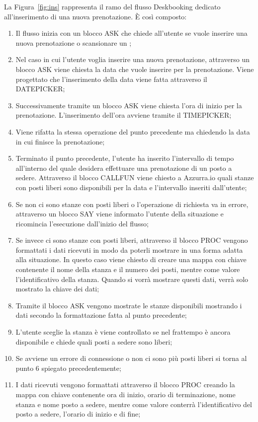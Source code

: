 La Figura~\ref{fig:ins} rappresenta il ramo del flusso Deskbooking dedicato all'inserimento di una nuova prenotazione. È così composto:
\begin{enumerate}
	\item Il flusso inizia con un blocco ASK che chiede all'utente se vuole inserire una nuova prenotazione o scansionare un ;
	\item Nel caso in cui l'utente voglia inserire una nuova prenotazione, attraverso un blocco ASK viene chiesta la data che vuole inserire per la prenotazione. Viene progettato che l'inserimento della data viene fatta attraverso il DATEPICKER;
	\item Successivamente tramite un blocco ASK viene chiesta l'ora di inizio per la prenotazione. L'inserimento dell'ora avviene tramite il TIMEPICKER;
	\item Viene rifatta la stessa operazione del punto precedente ma chiedendo la data in cui finisce la prenotazione;
	\item Terminato il punto precedente, l'utente ha inserito l'intervallo di tempo all'interno del quale desidera effettuare una prenotazione di un posto a sedere. Attraverso il blocco CALLFUN viene chiesto a Azzurra.io quali stanze con posti liberi sono disponibili per la data e l'intervallo inseriti dall'utente;
	\item Se non ci sono stanze con posti liberi o l'operazione di richiesta va in errore, attraverso un blocco SAY viene informato l'utente della situazione e ricomincia l'esecuzione dall'inizio del flusso;
	\item Se invece ci sono stanze con posti liberi, attraverso il blocco PROC vengono formattati i dati ricevuti in modo da poterli mostrare in una forma adatta alla situazione. In questo caso viene chiesto di creare una mappa con chiave contenente il nome della stanza e il numero dei posti, mentre come valore l'identificativo della stanza. Quando si vorrà mostrare questi dati, verrà solo mostrato la chiave dei dati;
	\item Tramite il blocco ASK vengono mostrate le stanze disponibili mostrando i dati secondo la formattazione fatta al punto precedente;
	\item L'utente sceglie la stanza è viene controllato se nel frattempo è ancora disponibile e chiede quali posti a sedere sono liberi;
	\item Se avviene un errore di connessione o non ci sono più posti liberi si torna al punto 6 spiegato precedentemente;
	\item I dati ricevuti vengono formattati attraverso il blocco PROC creando la mappa con chiave contenente ora di inizio, orario di terminazione, nome stanza e nome posto a sedere, mentre come valore conterrà l'identificativo del posto a sedere, l'orario di inizio e di fine;

\end{enumerate}
